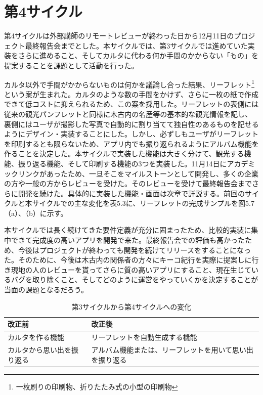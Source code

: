 \section{第4サイクル}
第4サイクルは外部講師のリモートレビューが終わった日から12月11日のプロジェクト最終報告会までとした。本サイクルでは、第3サイクルでは進めていた実装をさらに進めること、そしてカルタに代わる何か手間のかからない「もの」を提案することを課題として活動を行った。
\par カルタ以外で手間がかからないものは何かを議論し合った結果、リーフレット\footnote{一枚刷りの印刷物、折りたたみ式の小型の印刷物}という案が生まれた。カルタのような数の手間をかけず、さらに一枚の紙で作成できて低コストに抑えられるため、この案を採用した。リーフレットの表側には従来の観光パンフレットと同様に木古内の名産等の基本的な観光情報を記し、裏側にはユーザが撮影した写真で自動的に割り当てて独自性のあるものを記せるようにデザイン・実装することにした。しかし、必ずしもユーザがリーフレットを印刷するとも限らないため、アプリ内でも振り返られるようにアルバム機能を作ることを決定した。本サイクルで実装した機能は大きく分けて、観光する機能、振り返る機能、そして印刷する機能の3つを実装した。11月14日にアカデミックリンクがあったため、一旦そこをマイルストーンとして開発し、多くの企業の方や一般の方からレビューを受けた。そのレビューを受けて最終報告会までさらに開発を続けた。具体的に実装した機能・画面は次章で詳説する。前回のサイクルと本サイクルでの主な変化を表5.3に、リーフレットの完成サンプルを図5.7（a）、（b）に示す。
\par 本サイクルでは長く続けてきた要件定義が充分に固まったため、比較的実装に集中できて完成度の高いアプリを開発で来た。最終報告会での評価も高かったため、今後はプロジェクトが終わっても開発を続けてリリースをすることになった。そのために、今後は木古内の関係者の方々にキーコ紀行を実際に提案しに行き現地の人のレビューを貰ってさらに質の高いアプリにすること、現在生じているバグを取り除くこと、そしてどのように運営をやっていくかを決定することが当面の課題となるだろう。

\begin{table}[htb]
\centering
\addtocounter{table}{+0}
\caption{第3サイクルから第4サイクルへの変化}
  \begin{tabular}{|l|l|} \hline
    改正前&改正後  \\ \hline 
    カルタを作る機能 & \parbox{20zw}{リーフレットを自動生成する機能} \\  \hline
    カルタから思い出を振り返る &\parbox{20zw}{アルバム機能または、リーフレットを用いて思い出を振り返る}\\ \hline
  \end{tabular} 
\end{table}

